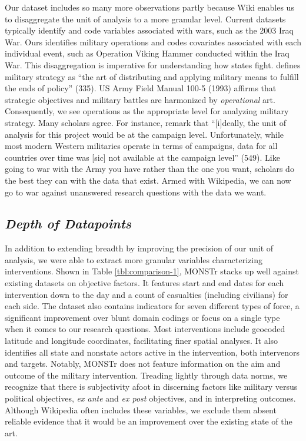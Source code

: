 \documentclass[fleqn,12pt]{article}
\begin{document}
Our dataset includes so many more observations partly because Wiki enables us to disaggregate the unit of analysis to a more granular level. Current datasets typically identify and code variables associated with wars, such as the 2003 Iraq War. Ours identifies military operations and codes covariates associated with each individual event, such as Operation Viking Hammer conducted within the Iraq War. This disaggregation is imperative for understanding how states fight. \citet{Hart62} defines military strategy as ``the art of distributing and applying military means to fulfill the ends of policy” (335). US Army Field Manual 100-5 (1993) affirms that strategic objectives and military battles are harmonized by \textit{operational} art. Consequently, we see operations as the appropriate level for analyzing military strategy. Many scholars agree. For instance, \citet{AllenMM17} remark that ``[i]deally, the unit of analysis for this project would be at the campaign level. Unfortunately, while most modern Western militaries operate in terms of campaigns, data for all countries over time was [sic] not available at the campaign level” (549). Like going to war with the Army you have rather than the one you want, scholars do the best they can with the data that exist. Armed with Wikipedia, we can now go to war against unanswered research questions with the data we want.

\subsection*{\textit{Depth of Datapoints}}
In addition to extending breadth by improving the precision of our unit of analysis, we were able to extract more granular variables characterizing interventions. Shown in Table \ref{tbl:comparison-1}, MONSTr stacks up well against existing datasets on objective factors. It features start and end dates for each intervention down to the day and a count of casualties (including civilians) for each side. The dataset also contains indicators for seven different types of force, a significant improvement over blunt domain codings or focus on a single type when it comes to our research questions. Most interventions include geocoded latitude and longitude coordinates, facilitating finer spatial analyses. It also identifies all state and nonstate actors active in the intervention, both intervenors and targets. Notably, MONSTr does not feature information on the aim and outcome of the military intervention. Treading lightly through data norms, we recognize that there is subjectivity afoot in discerning factors like military versus political objectives, \textit{ex ante} and \textit{ex post} objectives, and in interpreting outcomes. Although Wikipedia often includes these variables, we exclude them absent reliable evidence that it would be an improvement over the existing state of the art.
\end{document}
